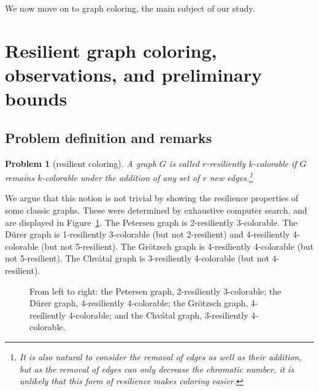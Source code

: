 \documentclass{article}[11pt]  %
\newtheorem*{prob}{Problem}
\begin{document}
We now move on to graph coloring, the main subject of our study.

\section{Resilient graph coloring, observations, and preliminary bounds}
\label{sec:resilient-coloring-obs-bounds}
\subsection{Problem definition and remarks}

\begin{prob}[resilient coloring] 
A graph $G$ is called \emph{$r$-resiliently
$k$-colorable} if $G$ remains $k$-colorable under the addition of any set of
$r$ new edges.\footnote{It is also natural to consider the removal of edges as
well as their addition, but as the removal of edges can only decrease the
chromatic number, it is unlikely that this form of resilience makes coloring
easier.} 
\end{prob}

We argue that this notion is not trivial by showing the resilience properties
of some classic graphs.  These were determined by exhaustive computer search,
and are displayed in Figure~\ref{fig:famous-graphs}.  The Petersen graph is
2-resiliently 3-colorable. The D{\"u}rer graph is 1-resiliently 3-colorable
(but not 2-resilient) and 4-resiliently 4-colorable (but not 5-resilient). The
Gr{\"o}tzsch graph is 4-resiliently 4-colorable (but not 5-resilient). The
Chv{\'a}tal graph is 3-resiliently 4-colorable (but not 4-resilient).

\begin{figure}
\centering
{}
\caption{From left to right: the Petersen graph, 2-resiliently 3-colorable;
the D{\"u}rer graph, 4-resiliently 4-colorable; the Gr{\"o}tzsch graph,
4-resiliently 4-colorable; and the Chv{\'a}tal graph, 3-resiliently
4-colorable.} 
\label{fig:famous-graphs}
\end{figure}
\end{document}
